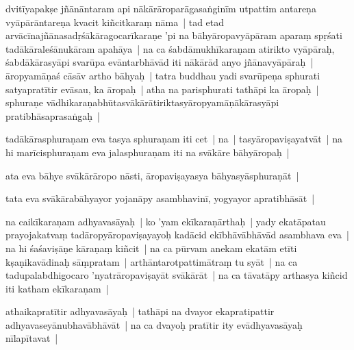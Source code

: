 \documentclass[article,12pt,a4paper]{memoir}%
\newcounter{parCount}
\begin{document}
	  \pstart \leavevmode%
	\label{thakur75-134.8}dvitīyapakṣe jñānāntaram api nākārāroparāgasaṅginīm utpattim antareṇa vyāpārāntareṇa kvacit kiñcitkaraṃ nāma | tad etad arvācīnajñānasadṛśākāragocarīkaraṇe 'pi na bāhyāropavyāpāram aparaṃ spṛśati tadākāraleśānukāram apahāya | na ca śabdāmukhīkaraṇam atirikto vyāpāraḥ, śabdākārasyāpi svarūpa evāntarbhāvād iti nākārād anyo jñānavyāpāraḥ | āropyamāṇaś cāsāv artho bāhyaḥ | tatra buddhau yadi svarūpeṇa sphurati satyapratītir evāsau, ka āropaḥ | atha na parisphurati tathāpi ka āropaḥ | sphuraṇe vādhikaraṇabhūtasvākārātiriktasyāropyamāṇākārasyāpi pratibhāsaprasaṅgaḥ |
	{}
	\pend%
      

	  \pstart \leavevmode%
	\label{thakur75-134.16}tadākārasphuraṇam eva tasya sphuraṇam iti cet | na | tasyāropaviṣayatvāt | na hi marīcisphuraṇam eva jalasphuraṇam iti na svākāre bāhyāropaḥ |
	{}
	\pend%
      

	  \pstart \leavevmode%
	ata eva bāhye svākārāropo nāsti, āropaviṣayasya bāhyasyāsphuraṇāt |
	{}
	\pend%
      

	  \pstart \leavevmode%
	tata eva svākārabāhyayor yojanāpy asambhavinī, yogyayor apratibhāsāt |
	{}
	\pend%
      

	  \pstart \leavevmode%
	na caikīkaraṇam adhyavasāyaḥ | ko 'yam ekīkaraṇārthaḥ | yady ekatāpatau prayojakatvaṃ tadāropyāropaviṣayayoḥ kadācid ekībhāvābhāvād asambhava eva | na hi śaśaviṣāṇe kāraṇaṃ kiñcit | na ca pūrvam anekam ekatām etīti kṣaṇikavādinaḥ sāṃpratam | arthāntarotpattimātraṃ tu syāt | na ca tadupalabdhigocaro 'nyatrāropaviṣayāt svākārāt | na ca tāvatāpy arthasya kiñcid iti katham ekīkaraṇam |
	{}
	\pend%
      

	  \pstart \leavevmode%
	\label{thakur75-134.25}athaikapratītir adhyavasāyaḥ | tathāpi na dvayor ekapratipattir adhyavaseyānubhavābhāvāt | na ca dvayoḥ pratītir ity evādhyavasāyaḥ nīlapītavat | \label{thakur75-134.27}
	{}
	\pend%
      
\end{document}
